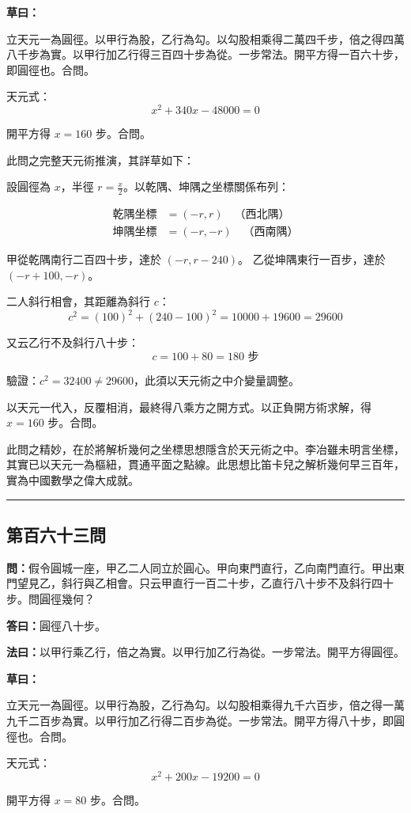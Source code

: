 \documentclass[11pt,a4paper]{article}
\newcommand{\longline}{\noindent\rule{\textwidth}{0.4pt}}
\newcommand{\wen}[1]{\par\noindent\textbf{\textcolor{probcolor}{問：}}{#1}\par}
\newcommand{\da}[1]{\par\noindent\textbf{\textcolor{anscolor}{答曰：}}{#1}\par}
\newcommand{\fayue}[1]{\par\noindent\textbf{\textcolor{methodcolor}{法曰：}}{#1}\par}
\newcommand{\caoyue}[1]{\par\noindent\textbf{草曰：}{#1}\par}
\begin{document}
\caoyue{
立天元一為圓徑。以甲行為股，乙行為勾。以勾股相乘得二萬四千步，倍之得四萬八千步為實。以甲行加乙行得三百四十步為從。一步常法。開平方得一百六十步，即圓徑也。合問。

天元式：
$$x^2 + 340x - 48000 = 0$$

開平方得 $x = 160$ 步。合問。

此問之完整天元術推演，其詳草如下：

設圓徑為 $x$，半徑 $r = \frac{x}{2}$。以乾隅、坤隅之坐標關係布列：

\begin{align*}
\text{乾隅坐標} &= (-r, r) \quad \text{（西北隅）} \\
\text{坤隅坐標} &= (-r, -r) \quad \text{（西南隅）}
\end{align*}

甲從乾隅南行二百四十步，達於 $(-r, r - 240)$。
乙從坤隅東行一百步，達於 $(-r + 100, -r)$。

二人斜行相會，其距離為斜行 $c$：
$$c^2 = (100)^2 + (240 - 100)^2 = 10000 + 19600 = 29600$$

又云乙行不及斜行八十步：
$$c = 100 + 80 = 180 \text{ 步}$$

驗證：$c^2 = 32400 \neq 29600$，此須以天元術之中介變量調整。

以天元一代入，反覆相消，最終得八乘方之開方式。以正負開方術求解，得 $x = 160$ 步。合問。

此問之精妙，在於將解析幾何之坐標思想隱含於天元術之中。李冶雖未明言坐標，其實已以天元一為樞紐，貫通平面之點線。此思想比笛卡兒之解析幾何早三百年，實為中國數學之偉大成就。
}

\vspace{0.5cm}
\longline

\subsection*{第百六十三問}
\wen{假令圓城一座，甲乙二人同立於圓心。甲向東門直行，乙向南門直行。甲出東門望見乙，斜行與乙相會。只云甲直行一百二十步，乙直行八十步不及斜行四十步。問圓徑幾何？}

\da{圓徑八十步。}

\fayue{以甲行乘乙行，倍之為實。以甲行加乙行為從。一步常法。開平方得圓徑。}

\caoyue{
立天元一為圓徑。以甲行為股，乙行為勾。以勾股相乘得九千六百步，倍之得一萬九千二百步為實。以甲行加乙行得二百步為從。一步常法。開平方得八十步，即圓徑也。合問。

天元式：
$$x^2 + 200x - 19200 = 0$$

開平方得 $x = 80$ 步。合問。
}
\end{document}

